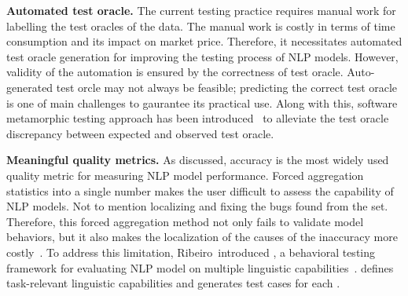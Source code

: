 \noindent \textbf{Automated test oracle.} The current testing practice
requires manual work for labelling the test oracles of the \ho
data. The manual work is costly in terms of time consumption and its
impact on market price. Therefore, it necessitates automated test
oracle generation for improving the testing process of NLP
models. However, validity of the automation is ensured by the
correctness of test oracle. Auto-generated test orcle may not always
be feasible; predicting the correct test oracle is one of main
challenges to gaurantee its practical use. Along with this, software
metamorphic testing approach has been
introduced~\cite{segura2016metamorphictest} to alleviate the test
oracle discrepancy between expected and observed test oracle.


\noindent \textbf{Meaningful quality metrics.}  As discussed, accuracy
is the most widely used quality metric for measuring NLP model
performance. Forced aggregation statistics into a single number makes
the user difficult to assess the capability of NLP models.  Not to
mention localizing and fixing the bugs found from the \ho
set. Therefore, this forced aggregation method not only fails to
validate model behaviors, but it also makes the localization of the
causes of the inaccuracy more costly~\cite{wu2019errudite}.
To address this limitation,
Ribeiro~\etal introduced \Cklst, a behavioral testing framework for
evaluating NLP model on multiple linguistic
capabilities~\cite{marcoACL2020checklist}. \Cklst defines
task-relevant linguistic capabilities and generates test cases for
each \lc.

